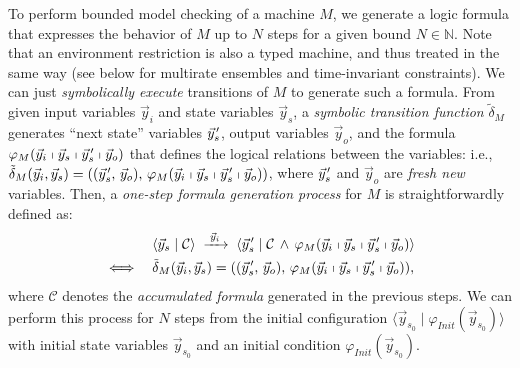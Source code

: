 \documentclass{sig-alternate}
\newcommand{\pvec}[1]{\vec{#1}\mkern2mu\vphantom{#1}} %
\begin{document}
To perform bounded model checking of a machine $M$,
we generate a logic formula
that expresses the behavior of $M$ up to $N$ steps
for a given bound $N \in \mathbb{N}$. 
Note that an environment restriction 
is also a typed machine, and thus treated in the same way
(see below for multirate ensembles and time-invariant constraints).
We can just \emph{symbolically execute}
transitions of $M$ to generate such a formula.
From given input variables $\vec{y}_{i}$ and state variables $\vec{y}_{s}$,
a \emph{symbolic transition function}  $\tilde{\delta}_M$ 
generates 
``next state'' variables $\pvec{y}_{\!s}'$,
output variables $\vec{y}_{o}$,
and the formula $\varphi_M(\vec{y}_i \shortmid \vec{y}_s \shortmid \pvec{y}_{\!s}' \shortmid \vec{y}_o)$
that defines the logical relations between the variables:
i.e.,
$\tilde{\delta}_M(\vec{y}_{i},  \vec{y}_{s}) = 
((\pvec{y}_{\!s}',\,
 \vec{y}_o),\,
\varphi_M(\vec{y}_i \shortmid \vec{y}_s \shortmid \pvec{y}_{\!s}' \shortmid \vec{y}_o))$,
where $\pvec{y}_{\!s}'$ and $\vec{y}_o$ are \emph{fresh new} variables.
Then,
a \emph{one-step formula generation process} for $M$ is straightforwardly defined as:
\begin{align*}
&
\langle\vec{y}_{s} \mid \mathcal{C} \rangle
\;\xrightarrow{\;\vec{y}_{i}\;}\;
\langle\pvec{y}_{\!s}' \mid
 \mathcal{C} \,\wedge\, \varphi_M(\vec{y}_i \shortmid \vec{y}_s \shortmid \pvec{y}_{\!s}' \shortmid \vec{y}_o)\rangle
\\
\iff\quad&
\tilde{\delta}_M(\vec{y}_{i},  \vec{y}_{s}) = 
((\pvec{y}_{\!s}',\,\vec{y}_o),\,
\varphi_M(\vec{y}_i \shortmid \vec{y}_s \shortmid \pvec{y}_{\!s}' \shortmid \vec{y}_o)),
\end{align*}
where $\mathcal{C}$ denotes the \emph{accumulated formula} generated in the previous steps.
We can perform 
this process for $N$ steps
from
the initial configuration 
$\langle\vec{y}_{s_0} \mid \varphi_{\mathit{Init}}(\vec{y}_{s_0}) \rangle$ 
with initial state variables $\vec{y}_{s_0}$
and an initial condition $\varphi_{\mathit{Init}}(\vec{y}_{s_0})$.
\end{document}
